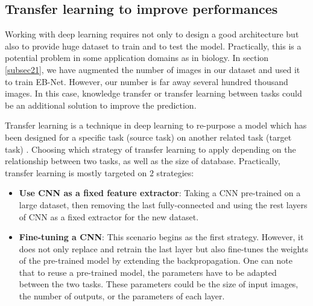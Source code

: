 \documentclass[review]{elsarticle}
\begin{document}

\subsection{Transfer learning to improve performances}
Working with deep learning requires not only to design a good architecture but also to provide huge dataset to train and to test the model. Practically, this is a potential problem in some application domains as in biology. In section \ref{subsec21}, we have augmented the number of images in our dataset and used it to train EB-Net. However, our number is far away several hundred thousand images. In this case, knowledge transfer or transfer learning between tasks could be an additional solution to improve the prediction. %

Transfer learning is a technique in deep learning to re-purpose a model which has been designed for a specific task (source task) on another related task (target task) \cite{olivas2009handbook, yosinski2014transferable}. Choosing which strategy of transfer learning to apply depending on the relationship between two tasks, as well as the size of database. Practically, transfer learning is mostly targeted on $2$ strategies:
\begin{itemize}
	\item \textbf{Use CNN as a fixed feature extractor}: Taking a CNN pre-trained on a large dataset, then removing the last fully-connected and using the rest layers of CNN as a fixed extractor for the new dataset.
	\item \textbf{Fine-tuning a CNN}: This scenario begins as the first strategy. However, it does not only replace and retrain the last layer but also fine-tunes the weights of the pre-trained model by extending the backpropagation. One can note that to reuse a pre-trained model, the parameters have to be adapted between the two tasks. These parameters could be the size of input images, the number of outputs, or the parameters of each layer.%
\end{itemize}
\end{document}
